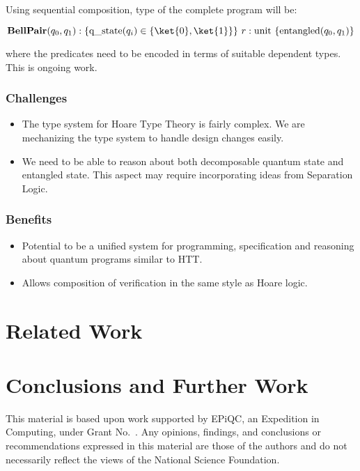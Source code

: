 \documentclass[acmsmall,nonacm,review,timestamp]{acmart}
\begin{document}
Using sequential composition, type of the complete program will be:

\[ \mathbf{BellPair}(q_0, q_1) : \{ \mathrm{q\_state}(q_i) \in \{\ket{0}, \ket{1} \}\}\ r : \mathrm{unit}\ \{ \mathrm{entangled}(q_0, q_1) \} \]

where the predicates need to be encoded in terms of suitable dependent types. This is ongoing work.

\subsubsection{Challenges}
\begin{itemize}
	\item The type system for Hoare Type Theory is fairly complex. We are mechanizing the type system to handle design changes easily.
	\item We need to be able to reason about both decomposable quantum state and entangled state. This aspect may require incorporating ideas from Separation Logic.
\end{itemize}

\subsubsection{Benefits}
\begin{itemize}
	\item Potential to be a unified system for programming, specification and reasoning about quantum programs similar to HTT.
	\item Allows composition of verification in the same style as Hoare logic.
\end{itemize}

\section{Related Work}


\section{Conclusions and Further Work}


\begin{acks}                            %
  This material is based upon work supported by
  EPiQC, an 
  Expedition in Computing, under Grant
  No.~.  Any opinions, findings, and
  conclusions or recommendations expressed in this material are those
  of the authors and do not necessarily reflect the views of the
  National Science Foundation.
\end{acks}




\end{document}
